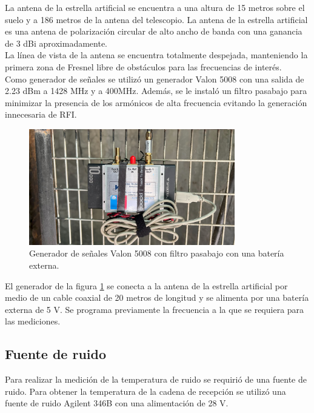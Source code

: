 La antena de la estrella artificial se encuentra a una altura de 15 metros sobre el suelo y a 186 metros de la antena del telescopio. La antena de la estrella artificial es una antena de polarización circular de alto ancho de banda con una ganancia de 3 dBi aproximadamente.\\

La línea de vista de la antena se encuentra totalmente despejada, manteniendo la primera zona de Fresnel libre de obstáculos para las frecuencias de interés.\\

Como generador de señales se utilizó un generador Valon 5008 con una salida de 2.23 dBm a 1428 MHz y a 400MHz. Además, se le instaló un filtro pasabajo para minimizar la presencia de los armónicos de alta frecuencia evitando la generación innecesaria de RFI.\\

\begin{figure}
    \centering
    \includegraphics[width=0.8\textwidth]{img/valon}
    \caption{Generador de señales Valon 5008 con filtro pasabajo con una batería externa.}
    \label{fig:generador}
\end{figure}

El generador de la figura \ref{fig:generador} se conecta a la antena de la estrella artificial por medio de un cable coaxial de 20 metros de longitud y se alimenta por una batería externa de 5 V. Se programa previamente la frecuencia a la que se requiera para las mediciones.\\

\subsection{Fuente de ruido}

Para realizar la medición de la temperatura de ruido se requirió de una fuente de ruido. Para obtener la temperatura de la cadena de recepción se utilizó una fuente de ruido Agilent 346B con una alimentación de 28 V.\\

